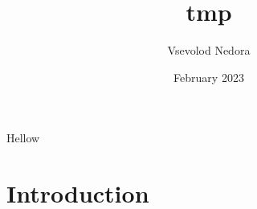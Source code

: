 \documentclass{article}
\title{tmp}
\author{Vsevolod Nedora}
\date{February 2023}
\begin{document}
    
    Hellow
    
    
    
    \maketitle
    
    \section{Introduction}
    
\end{document}

